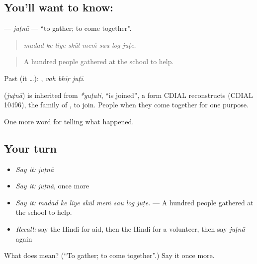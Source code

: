 \subsection*{You'll want to know: }
\textbf{} — \emph{juṭnā} — \textquotedblleft{}to gather; to come together\textquotedblright{}.

\begin{quote}
       
\end{quote}

\begin{quote}
\emph{madad ke liye skūl meṁ sau log juṭe.}
\end{quote}

\begin{quote}
A hundred people gathered at the school to help.
\end{quote}

Past (it …):   , \emph{vah bhīṛ juṭī}.

\begin{cousinweb}
\textbf{} (\emph{juṭnā}) is inherited from \emph{*yuṭati}, \textquotedblleft{}is joined\textquotedblright{}, a form CDIAL reconstructs (CDIAL 10496), the family of \textbf{}, to join. People \textbf{ } when they come together for one purpose.
\end{cousinweb}

\begin{grammarlens}[title={What you've built}]
One more word for telling what happened.
\end{grammarlens}

\subsection*{Your turn}
\begin{itemize}
\raggedright
  \item \emph{Say it:} \emph{juṭnā}
  \item \emph{Say it:} \emph{juṭnā}, once more
  \item \emph{Say it:} \emph{madad ke liye skūl meṁ sau log juṭe.} — A hundred people gathered at the school to help.
  \item \emph{Recall:} say the Hindi for aid, then the Hindi for a volunteer, then say \emph{juṭnā} again
\end{itemize}

\begin{tcolorbox}[breakable,colback=teal!4,colframe=teal!35!black,title={Before you move on}]
What does  mean? (\textquotedblleft{}To gather; to come together\textquotedblright{}.) Say it once more.
\end{tcolorbox}

